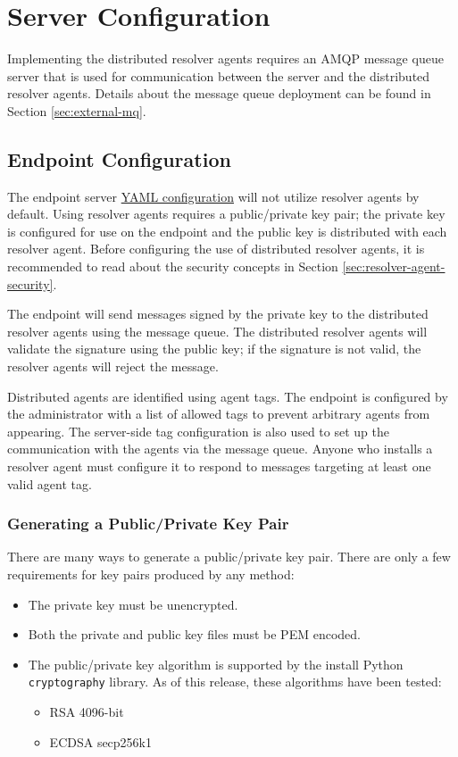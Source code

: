 \section{Server Configuration}\label{sec:resolver-server}

Implementing the distributed resolver agents requires an AMQP message queue server that
is used for communication between the \cxoneflow server and the distributed resolver
agents.  Details about the message queue deployment can be found in Section \ref{sec:external-mq}.

\subsection{\cxoneflow Endpoint Configuration}

The endpoint server \hyperref[sec:yaml-config]{YAML configuration} will not utilize resolver agents
by default.  Using resolver agents requires a public/private key pair; the private key is configured
for use on the \cxoneflow endpoint and the public key is distributed with each resolver agent.  Before
configuring the use of distributed resolver agents, it is recommended to read about the security
concepts in Section \ref{sec:resolver-agent-security}.

The \cxoneflow endpoint will send messages signed by the private key to the distributed resolver
agents using the message queue.  The distributed resolver agents will validate the signature
using the public key; if the signature is not valid, the resolver agents will reject the message.

Distributed agents are identified using agent tags.  The \cxoneflow endpoint is configured by the
administrator with a list of allowed tags to prevent arbitrary agents from appearing.  The
server-side tag configuration is also used to set up the communication with the agents via
the message queue.  Anyone who installs a resolver agent must configure it to respond to messages
targeting at least one valid agent tag.


\subsubsection{Generating a Public/Private Key Pair}

There are many ways to generate a public/private key pair.  There are only a few requirements
for key pairs produced by any method:

\begin{itemize}
  \item The private key must be unencrypted.
  \item Both the private and public key files must be PEM encoded.
  \item The public/private key algorithm is supported by the install Python \texttt{cryptography} library.
    As of this release, these algorithms have been tested:
  \begin{itemize}
      \item RSA 4096-bit
      \item ECDSA secp256k1
  \end{itemize}
\end{itemize}

